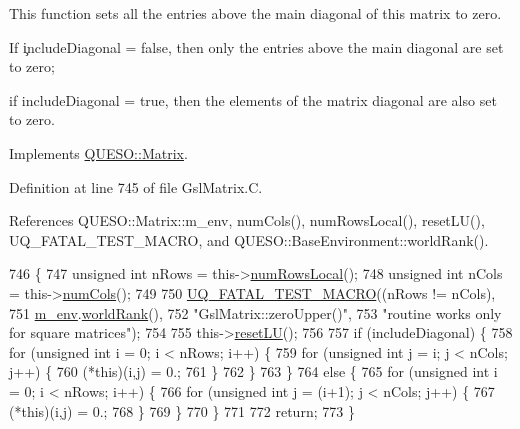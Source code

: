 This function sets all the entries above the main diagonal of {\ttfamily this} matrix to zero. 

\begin{DoxyVerb}If \c includeDiagonal = false, then only the entries above the main diagonal are set to zero; 
\end{DoxyVerb}
 if {\ttfamily include\-Diagonal} = true, then the elements of the matrix diagonal are also set to zero. 

Implements \hyperlink{class_q_u_e_s_o_1_1_matrix_a0c2624bc26684a9a119252fcc0401871}{Q\-U\-E\-S\-O\-::\-Matrix}.



Definition at line 745 of file Gsl\-Matrix.\-C.



References Q\-U\-E\-S\-O\-::\-Matrix\-::m\-\_\-env, num\-Cols(), num\-Rows\-Local(), reset\-L\-U(), U\-Q\-\_\-\-F\-A\-T\-A\-L\-\_\-\-T\-E\-S\-T\-\_\-\-M\-A\-C\-R\-O, and Q\-U\-E\-S\-O\-::\-Base\-Environment\-::world\-Rank().


\begin{DoxyCode}
746 \{
747   \textcolor{keywordtype}{unsigned} \textcolor{keywordtype}{int} nRows = this->\hyperlink{class_q_u_e_s_o_1_1_gsl_matrix_ab5ec937a9fd439eef1a87e12c0dbccb4}{numRowsLocal}();
748   \textcolor{keywordtype}{unsigned} \textcolor{keywordtype}{int} nCols = this->\hyperlink{class_q_u_e_s_o_1_1_gsl_matrix_ad5005f168fe030468e834776afb1859b}{numCols}();
749 
750   \hyperlink{_defines_8h_a56d63d18d0a6d45757de47fcc06f574d}{UQ\_FATAL\_TEST\_MACRO}((nRows != nCols),
751                       \hyperlink{class_q_u_e_s_o_1_1_matrix_a247fb0fc0b87fecdee054bb4660b68e8}{m\_env}.\hyperlink{class_q_u_e_s_o_1_1_base_environment_a78b57112bbd0e6dd0e8afec00b40ffa7}{worldRank}(),
752                       \textcolor{stringliteral}{"GslMatrix::zeroUpper()"},
753                       \textcolor{stringliteral}{"routine works only for square matrices"});
754 
755   this->\hyperlink{class_q_u_e_s_o_1_1_gsl_matrix_ab55ec308530e4135a719181a6351840c}{resetLU}();
756 
757   \textcolor{keywordflow}{if} (includeDiagonal) \{
758     \textcolor{keywordflow}{for} (\textcolor{keywordtype}{unsigned} \textcolor{keywordtype}{int} i = 0; i < nRows; i++) \{
759       \textcolor{keywordflow}{for} (\textcolor{keywordtype}{unsigned} \textcolor{keywordtype}{int} j = i; j < nCols; j++) \{
760         (*this)(i,j) = 0.;
761       \}
762     \}
763   \}
764   \textcolor{keywordflow}{else} \{
765     \textcolor{keywordflow}{for} (\textcolor{keywordtype}{unsigned} \textcolor{keywordtype}{int} i = 0; i < nRows; i++) \{
766       \textcolor{keywordflow}{for} (\textcolor{keywordtype}{unsigned} \textcolor{keywordtype}{int} j = (i+1); j < nCols; j++) \{
767         (*this)(i,j) = 0.;
768       \}
769     \}
770   \}
771 
772   \textcolor{keywordflow}{return};
773 \}
\end{DoxyCode}


